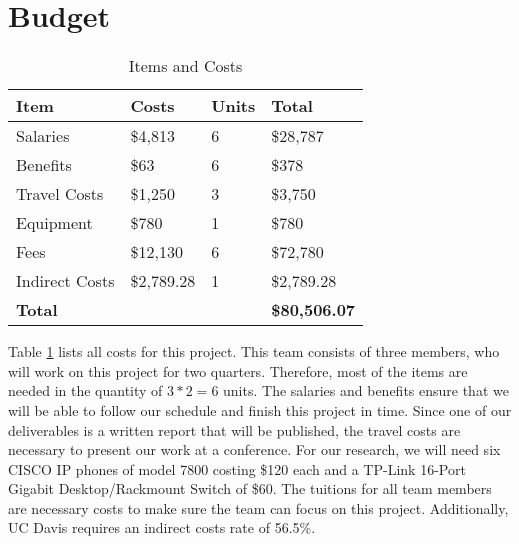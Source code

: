 \section{Budget}

\begin{table}[htb]
\centering
\caption{Items and Costs}
\label{budget}
\begin{tabular}{|l|l|l|l|}
\hline
\textbf{Item}  & \textbf{Costs} & \textbf{Units} & \textbf{Total}        \\ \hline
Salaries       & \$4,813        & 6              & \$28,787              \\ \hline
Benefits       & \$63           & 6              & \$378                 \\ \hline
Travel Costs   & \$1,250        & 3              & \$3,750               \\ \hline
Equipment      & \$780          & 1              & \$780                 \\ \hline
Fees           & \$12,130       & 6              & \$72,780              \\ \hline
Indirect Costs & \$2,789.28     & 1              & \$2,789.28           \\ \hline
\textbf{Total} &                &                & \textbf{\$80,506.07} \\ \hline
\end{tabular}
\end{table}

Table \ref{budget} lists all costs for this project. This team consists of three members, who will work on this project for two quarters. Therefore, most of the items are needed in the quantity of $3*2=6$ units. The salaries and benefits ensure that we will be able to follow our schedule and finish this project in time. Since one of our deliverables is a written report that will be published, the travel costs are necessary to present our work at a conference. For our research, we will need six CISCO IP phones of model 7800 costing \$120 each and a TP-Link 16-Port Gigabit Desktop/Rackmount Switch of \$60. The tuitions for all team members are necessary costs to make sure the team can focus on this project. Additionally, UC Davis requires an indirect costs rate of 56.5\%.
